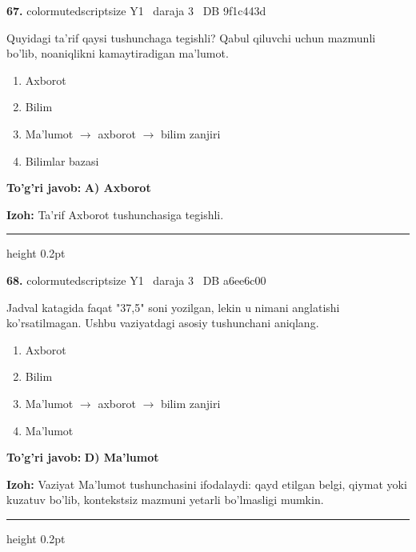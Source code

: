 \documentclass[10pt,a4paper,oneside]{article}
\begin{document}
\noindent\textbf{\color{ink}67.}  {color{muted}scriptsize Y1 \textbullet\ daraja 3 \textbullet\ DB 9f1c443d}
\par
Quyidagi ta'rif qaysi tushunchaga tegishli? Qabul qiluvchi uchun mazmunli bo'lib, noaniqlikni kamaytiradigan ma'lumot.
\begin{enumerate}[label=\Alph*),leftmargin=9mm]
\item Axborot
\item Bilim
\item Ma'lumot \ensuremath{\to} axborot \ensuremath{\to} bilim zanjiri
\item Bilimlar bazasi
\end{enumerate}
\begin{tcolorbox}[enhanced,breakable,colback=teal!4,colframe=teal!50!black,boxrule=0.5pt,arc=1.1mm,left=3mm,right=3mm,top=1.7mm,bottom=1.7mm,before skip=2mm,after skip=2mm]
\textbf{\color{teal}To'g'ri javob:} \textbf{A) Axborot}
\par\smallskip
\textbf{Izoh:} Ta'rif Axborot tushunchasiga tegishli.
\end{tcolorbox}
\vspace{2mm}\hrule height 0.2pt \vspace{3mm}

\noindent\textbf{\color{ink}68.}  {color{muted}scriptsize Y1 \textbullet\ daraja 3 \textbullet\ DB a6ee6c00}
\par
Jadval katagida faqat "37,5" soni yozilgan, lekin u nimani anglatishi ko'rsatilmagan. Ushbu vaziyatdagi asosiy tushunchani aniqlang.
\begin{enumerate}[label=\Alph*),leftmargin=9mm]
\item Axborot
\item Bilim
\item Ma'lumot \ensuremath{\to} axborot \ensuremath{\to} bilim zanjiri
\item Ma'lumot
\end{enumerate}
\begin{tcolorbox}[enhanced,breakable,colback=teal!4,colframe=teal!50!black,boxrule=0.5pt,arc=1.1mm,left=3mm,right=3mm,top=1.7mm,bottom=1.7mm,before skip=2mm,after skip=2mm]
\textbf{\color{teal}To'g'ri javob:} \textbf{D) Ma'lumot}
\par\smallskip
\textbf{Izoh:} Vaziyat Ma'lumot tushunchasini ifodalaydi: qayd etilgan belgi, qiymat yoki kuzatuv bo'lib, kontekstsiz mazmuni yetarli bo'lmasligi mumkin.
\end{tcolorbox}
\vspace{2mm}\hrule height 0.2pt \vspace{3mm}
\end{document}
